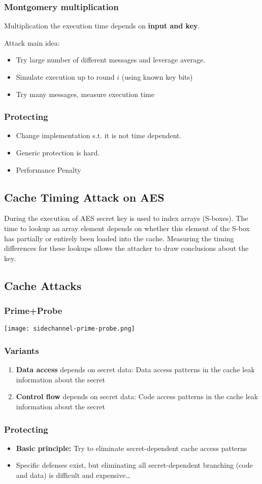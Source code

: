 \subsubsection{Montgomery multiplication}
Multiplication the execution time depends on \textbf{input and key}.

Attack main idea:
\begin{itemize}
  \item Try large number of different messages and leverage average.
  \item Simulate execution up to round $i$ (using known key bits)
  \item Try many messages, measure execution time
\end{itemize}

\subsubsection{Protecting}
\begin{itemize}
  \item Change implementation s.t. it is not time dependent.
  \item Generic protection is hard.
  \item Performance Penalty
\end{itemize}

\subsection{Cache Timing Attack on AES}
During the execution of AES secret key is used to
index arrays (S-boxes). The time to lookup an array element depends
on whether this element of the S-box has partially or entirely been loaded into the
cache. Measuring the timing differences for these lookups allows the attacker to draw
conclusions about the key.

\subsection{Cache Attacks}
\subsubsection{Prime+Probe}
\texttt{[image: sidechannel-prime-probe.png]}
\subsubsection{Variants}
\begin{enumerate}
	\item \textbf{Data access} depends on secret data: Data access patterns
	  in the cache leak information about the secret
	\item \textbf{Control flow} depends on secret data: Code access
	  patterns in the cache leak information about the secret
\end{enumerate}
\subsubsection{Protecting}
\begin{itemize}
	\item \textbf{Basic principle:}
Try to eliminate secret-dependent cache access patterns
\item Specific defenses exist, but eliminating all secret-dependent
branching (code and data) is difficult and expensive…
\end{itemize}

